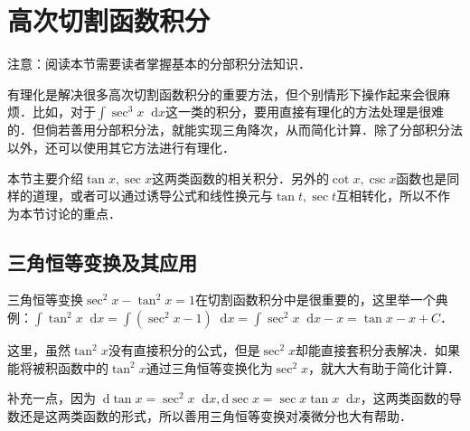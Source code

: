 \documentclass{ctexbook}
\newcommand*{\dif}{\mathop{}\!\mathrm{d}}
\begin{document}
\section{高次切割函数积分}
注意：阅读本节需要读者掌握基本的分部积分法知识．\par
有理化是解决很多高次切割函数积分的重要方法，但个别情形下操作起来会很麻烦．比如，对于$\int\sec^{3}{x}\dif{x}$这一类的积分，要用直接有理化的方法处理是很难的．但倘若善用分部积分法，就能实现三角降次，从而简化计算．除了分部积分法以外，还可以使用其它方法进行有理化．\par
本节主要介绍$\tan{x},\sec{x}$这两类函数的相关积分．另外的$\cot{x},\csc{x}$函数也是同样的道理，或者可以通过诱导公式和线性换元与$\tan{t},\sec{t}$互相转化，所以不作为本节讨论的重点．\par
\subsection{三角恒等变换及其应用}
三角恒等变换$\sec^{2}{x}-\tan^{2}{x}=1$在切割函数积分中是很重要的，这里举一个典例：$\int\tan^{2}{x}\dif{x}=\int\left(\sec^{2}{x}-1\right)\dif{x}=\int\sec^{2}{x}\dif{x}-x=\tan{x}-x+C$．\par
这里，虽然$\tan^{2}{x}$没有直接积分的公式，但是$\sec^{2}{x}$却能直接套积分表解决．如果能将被积函数中的$\tan^{2}{x}$通过三角恒等变换化为$\sec^{2}{x}$，就大大有助于简化计算．\par
补充一点，因为$\dif{\tan{x}}=\sec^{2}{x}\dif{x},\mathrm{d}\sec{x}=\sec{x}\tan{x}\dif{x}$，这两类函数的导数还是这两类函数的形式，所以善用三角恒等变换对凑微分也大有帮助．\par
\end{document}
